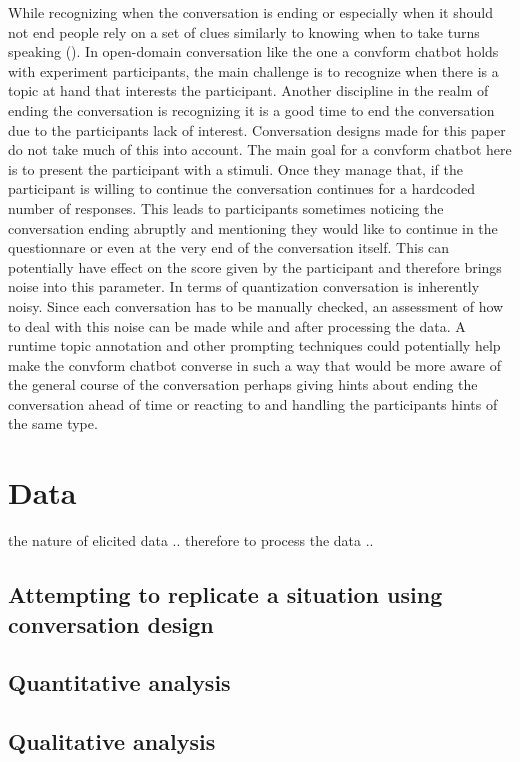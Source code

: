 \documentclass[12pt]{report}
\begin{document}
{While recognizing when the conversation is ending
or especially when it should not end
people rely on a set of clues
similarly to knowing when to take turns speaking ().
In open-domain conversation
like the one a convform chatbot holds with experiment participants,
the main challenge is to recognize
when there is a topic at hand
that interests the participant.
Another discipline in the realm of ending the conversation
is recognizing it is a good time to end the conversation
due to the participants lack of interest.
Conversation designs made for this paper
do not take much of this into account.
The main goal for a convform chatbot here
is to present the participant with a stimuli.
Once they manage that,
if the participant is willing to continue
the conversation continues for a hardcoded number of responses.
This leads to participants sometimes noticing
the conversation ending abruptly
and mentioning they would like to continue
in the questionnare
or even at the very end of the conversation itself.
This can potentially have effect on
the score given by the participant
and therefore brings noise into this parameter.
In terms of quantization
conversation is inherently noisy.
Since each conversation has to be manually checked,
an assessment of how to deal with this noise can be made
while and after processing the data.
A runtime topic annotation
and other prompting techniques
could potentially help make
the convform chatbot converse in such a way
that would be more aware of the general course of the conversation
perhaps giving hints about ending the conversation ahead of time
or reacting to and handling the participants hints of the same type.

\section{Data}

\par
the nature of elicited data ..
therefore to process the data ..

\subsection{Attempting to replicate a situation using conversation design}

\subsection{Quantitative analysis}

\subsection{Qualitative analysis}


}
\end{document}
